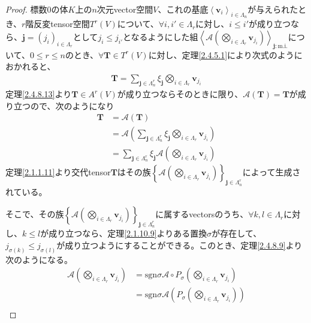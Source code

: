 \documentclass[dvipdfmx]{jsarticle}
\begin{document}
\begin{proof}
標数$0$の体$K$上の$n$次元vector空間$V$、これの基底$\left\langle \mathbf{v}_{i} \right\rangle_{i \in \varLambda_{n}}$が与えられたとき、$r$階反変tensor空間$T^{r}(V)$について、$\forall i,i' \in \varLambda_{r}$に対し、$i \leq i'$が成り立つなら、$\mathbf{j}=\left( j_{i} \right)_{i \in \varLambda_{r}}$として$j_{i} \leq j_{i'}$となるようにした組$\left\langle \mathcal{A}\left( \bigotimes_{i \in \varLambda_{r}} \mathbf{v}_{j_{i}} \right) \right\rangle_{\mathbf{j}:\mathrm{m.i.} }$について、$0 \leq r \leq n$のとき、$\forall\mathbf{T} \in T^{r}(V)$に対し、定理\ref{2.4.5.1}により次式のようにおかれると、
\begin{align*}
\mathbf{T} = \sum_{\mathbf{j} \in \varLambda_{n}^{r}} {\xi_{\mathbf{j}}\bigotimes_{i \in \varLambda_{r}} \mathbf{v}_{j_{i}}}
\end{align*}
定理\ref{2.4.8.13}より$\mathbf{T} \in A^{r}(V)$が成り立つならそのときに限り、$\mathcal{A}\left( \mathbf{T} \right) = \mathbf{T}$が成り立つので、次のようになり
\begin{align*}
\mathbf{T} &= \mathcal{A}\left( \mathbf{T} \right)\\
&= \mathcal{A}\left( \sum_{\mathbf{j} \in \varLambda_{n}^{r}} {\xi_{\mathbf{j}}\bigotimes_{i \in \varLambda_{r}} \mathbf{v}_{j_{i}}} \right)\\
&= \sum_{\mathbf{j} \in \varLambda_{n}^{r}} {\xi_{\mathbf{j}}\mathcal{A}\left( \bigotimes_{i \in \varLambda_{r}} \mathbf{v}_{j_{i}} \right)}
\end{align*}
定理\ref{2.1.1.11}より交代tensor$\mathbf{T}$はその族$\left\{ \mathcal{A}\left( \bigotimes_{i \in \varLambda_{r}} \mathbf{v}_{j_{i}} \right) \right\}_{\mathbf{j} \in \varLambda_{n}^{r}}$によって生成されている。\par
そこで、その族$\left\{ \mathcal{A}\left( \bigotimes_{i \in \varLambda_{r}} \mathbf{v}_{j_{i}} \right) \right\}_{\mathbf{j} \in \varLambda_{n}^{r}}$に属するvectorsのうち、$\forall k,l \in \varLambda_{r}$に対し、$k \leq l$が成り立つなら、定理\ref{2.1.10.9}よりある置換$\sigma$が存在して、$j_{\sigma(k)} \leq j_{\sigma(l)}$が成り立つようにすることができる。このとき、定理\ref{2.4.8.9}より次のようになる。
\begin{align*}
\mathcal{A}\left( \bigotimes_{i \in \varLambda_{r}} \mathbf{v}_{j_{i}} \right) &= \mathrm{sgn}\sigma\mathcal{A \circ}P_{\sigma}\left( \bigotimes_{i \in \varLambda_{r}} \mathbf{v}_{j_{i}} \right)\\
&= \mathrm{sgn}\sigma\mathcal{A}\left( P_{\sigma}\left( \bigotimes_{i \in \varLambda_{r}} \mathbf{v}_{j_{i}} \right) \right)\\

\end{align*}
\end{proof}
\end{document}
